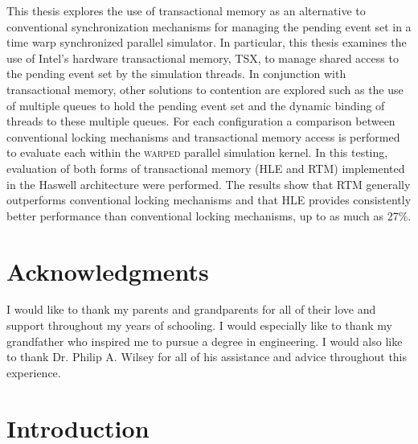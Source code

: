 \documentclass[11pt]{book}
\begin{document}
This thesis explores the use of transactional memory as an alternative to
conventional synchronization mechanisms for managing the pending event set in a
time warp synchronized parallel simulator.  In particular, this thesis examines
the use of Intel's hardware transactional memory, TSX, to manage shared access
to the pending event set by the simulation threads.  In conjunction with
transactional memory, other solutions to contention are explored such as the use
of multiple queues to hold the pending event set and the dynamic binding of
threads to these multiple queues.  For each configuration a comparison between
conventional locking mechanisms and transactional memory access is performed to
evaluate each within the \textsc{warped} parallel simulation kernel.  In this
testing, evaluation of both forms of transactional memory (HLE and RTM)
implemented in the Haswell architecture were performed.  The results show that
RTM generally outperforms  conventional locking mechanisms and that HLE provides
consistently better performance than conventional locking mechanisms, up to as
much as 27\%.


\chapter*{Acknowledgments} 

I would like to thank my parents and grandparents for all of their love and
support throughout my years of schooling.  I would especially like to thank my
grandfather who inspired me to pursue a degree in engineering.  I would also
like to thank Dr. Philip A. Wilsey for all of his assistance and advice
throughout this experience.

\tableofcontents \markright{ }
\listoffigures \markright{ }
\listoftables \markright{ }

\clearpage
{} \setcounter{page}{1}

\chapter{Introduction}\label{intro} 
\end{document}
